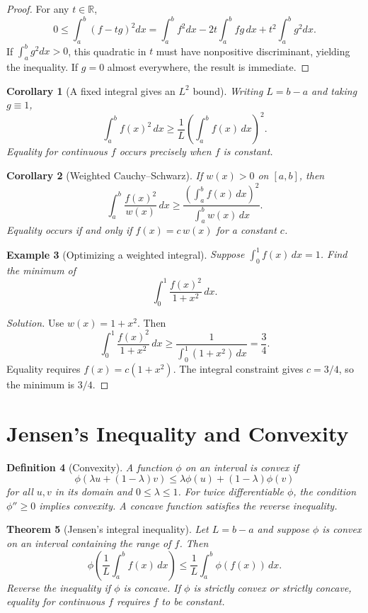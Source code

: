 \documentclass[11pt]{article}
\theoremstyle{plaincolon}
\newtheorem{theorem}{Theorem}[section]
\newtheorem{corollary}[theorem]{Corollary}
\theoremstyle{definitioncolon}
\newtheorem{definition}[theorem]{Definition}
\newtheorem{example}[theorem]{Example}
\theoremstyle{remarkcolon}
\newenvironment{solution}{\begin{proof}[Solution]}{\end{proof}}
\numberwithin{equation}{section}
\newcommand{\RR}{\mathbb{R}}
\begin{document}
\begin{proof}
For any $t\in\RR$,
\[
0\le \int_a^b(f-tg)^2dx
=\int_a^b f^2dx-2t\int_a^b fg\,dx+t^2\int_a^b g^2dx.
\]
If $\int_a^b g^2dx>0$, this quadratic in $t$ must have nonpositive discriminant, yielding the inequality. If $g=0$ almost everywhere, the result is immediate.
\end{proof}

\begin{corollary}[A fixed integral gives an $L^2$ bound]
Writing $L=b-a$ and taking $g\equiv1$,
\[
\int_a^b f(x)^2\,dx\ge\frac1L\left(\int_a^b f(x)\,dx\right)^2.
\]
Equality for continuous $f$ occurs precisely when $f$ is constant.
\end{corollary}

\begin{corollary}[Weighted Cauchy--Schwarz]
If $w(x)>0$ on $[a,b]$, then
\[
\int_a^b\frac{f(x)^2}{w(x)}\,dx\ge
\frac{\left(\int_a^b f(x)\,dx\right)^2}{\int_a^b w(x)\,dx}.
\]
Equality occurs if and only if $f(x)=c\,w(x)$ for a constant $c$.
\end{corollary}

\begin{example}[Optimizing a weighted integral]
Suppose $\int_0^1 f(x)\,dx=1$. Find the minimum of
\[
\int_0^1\frac{f(x)^2}{1+x^2}\,dx.
\]
\end{example}

\begin{solution}
Use $w(x)=1+x^2$. Then
\[
\int_0^1\frac{f(x)^2}{1+x^2}\,dx\ge
\frac{1}{\int_0^1(1+x^2)\,dx}=\frac34.
\]
Equality requires $f(x)=c(1+x^2)$. The integral constraint gives $c=3/4$, so the minimum is $\boxed{3/4}$.
\end{solution}

\section{Jensen's Inequality and Convexity}

\begin{definition}[Convexity]
A function $\phi$ on an interval is \emph{convex} if
\[
\phi(\lambda u+(1-\lambda)v)\le
\lambda\phi(u)+(1-\lambda)\phi(v)
\]
for all $u,v$ in its domain and $0\le\lambda\le1$. For twice differentiable $\phi$, the condition $\phi''\ge0$ implies convexity. A \emph{concave} function satisfies the reverse inequality.
\end{definition}

\begin{theorem}[Jensen's integral inequality]
Let $L=b-a$ and suppose $\phi$ is convex on an interval containing the range of $f$. Then
\[
\phi\left(\frac1L\int_a^b f(x)\,dx\right)
\le\frac1L\int_a^b\phi(f(x))\,dx.
\]
Reverse the inequality if $\phi$ is concave. If $\phi$ is strictly convex or strictly concave, equality for continuous $f$ requires $f$ to be constant.
\end{theorem}
\end{document}
